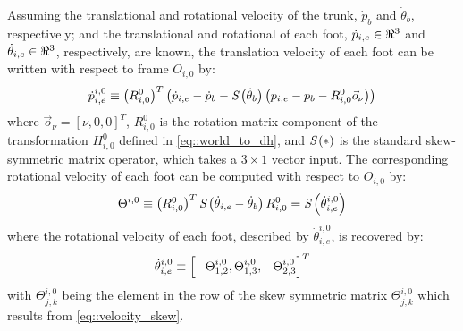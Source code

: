 			Assuming the translational and rotational velocity of the trunk, $\dot{p}_{b}$ and $\dot{\theta}_{b}$, respectively; and the translational and rotational of each \Ith foot, $\dot{p}_{i,e} \in\Re^{3}$ and $\dot{\theta}_{i,e} \in\Re^{3}$, respectively, are known, the translation velocity of each \Ith foot can be written with respect to frame $O_{i,0}$ by:
				\begin{equation}
					\dot{p}_{i,e}^{i,0} \equiv \left(R^{0}_{i,0}\right)^{T} \left( \dot{p}_{i,e} - \dot{p}_{b} - \emph{S}\left( \dot{\theta}_{b} \right) \left( {p}_{i,e} - {p}_{b} - R^{0}_{i,0} \vec{o}_{\nu} \right) \right)
				\end{equation}
			where $\vec{o}_{\nu} = [\nu,0,0]^{T}$, $R^{0}_{i,0}$ is the rotation-matrix component of the transformation $H^{0}_{i,0}$ defined in \ref{eq::world_to_dh}, and $\emph{S}\left(*\right)$ is the standard skew-symmetric matrix operator, which takes a $3\times1$ vector input. The corresponding rotational velocity of each \Ith foot  can be computed with respect to $O_{i,0}$ by:
				\begin{equation}
					\Theta^{i,0} \equiv \left( R^{0}_{i,0} \right)^{T} \emph{S}\left( \dot{\theta}_{i,e} - \dot{\theta}_{b} \right) R^{0}_{i,0}  = \emph{S}\left( \dot{\theta}^{i,0}_{i,e} \right)
				\label{eq::velocity_skew}
				\end{equation}
			where the rotational velocity of each foot, described by $\dot{\theta}^{i,0}_{i,e}$, is recovered by:
				\begin{equation}
					\dot{\theta}^{i,0}_{i,e} \equiv \left[ 
						-\Theta^{i,0}_{1,2},
						 \Theta^{i,0}_{1,3},
						-\Theta^{i,0}_{2,3}
					\right]^{T}
				\end{equation}
			with $\Theta^{i,0}_{j,k}$ being the \Kth element in the \Jth row of the skew symmetric matrix $\Theta^{i,0}_{j,k}$ which results from \ref{eq::velocity_skew}.

